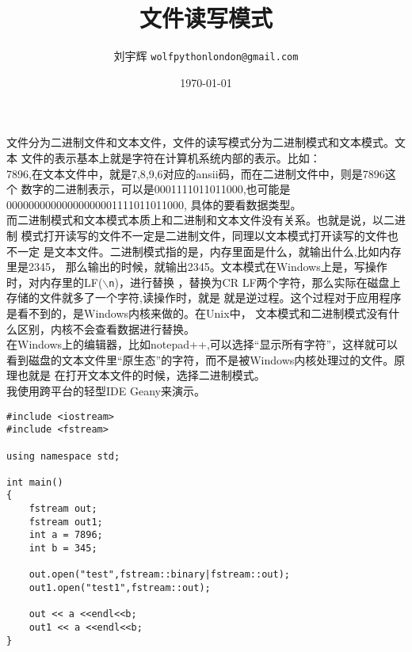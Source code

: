 \documentclass[11pt]{article}
\title{文件读写模式}
\author{刘宇辉 \texttt{wolfpythonlondon@gmail.com}}
\date{\today}
\begin{document}
\maketitle

文件分为二进制文件和文本文件，文件的读写模式分为二进制模式和文本模式。文本
文件的表示基本上就是字符在计算机系统内部的表示。比如：\\
7896,在文本文件中，就是7,8,9,6对应的ansii码，而在二进制文件中，则是7896这个
数字的二进制表示，可以是0001111011011000,也可能是00000000000000000001111011011000,
具体的要看数据类型。\\

而二进制模式和文本模式本质上和二进制和文本文件没有关系。也就是说，以二进制
模式打开读写的文件不一定是二进制文件，同理以文本模式打开读写的文件也不一定
是文本文件。二进制模式指的是，内存里面是什么，就输出什么,比如内存里是2345，
那么输出的时候，就输出2345。文本模式在Windows上是，写操作时，对内存里的LF(\texttt{$\backslash$n})，进行替换
，替换为CR
LF两个字符，那么实际在磁盘上存储的文件就多了一个字符,读操作时，就是
就是逆过程。这个过程对于应用程序是看不到的，是Windows内核来做的。在Unix中，
文本模式和二进制模式没有什么区别，内核不会查看数据进行替换。\\

在Windows上的编辑器，比如notepad++,可以选择“显示所有字符”，这样就可以看到磁盘的文本文件里“原生态”的字符，而不是被Windows内核处理过的文件。原理也就是
在打开文本文件的时候，选择二进制模式。\\

我使用跨平台的轻型IDE Geany来演示。



%
\begin{lstlisting}[name=test.cpp]
#include <iostream>
#include <fstream>

using namespace std;

int main()
{
	fstream out;
	fstream out1;
	int a = 7896;
	int b = 345;

	out.open("test",fstream::binary|fstream::out);
	out1.open("test1",fstream::out);

	out << a <<endl<<b;
	out1 << a <<endl<<b;
}
\end{lstlisting}
\end{document}
